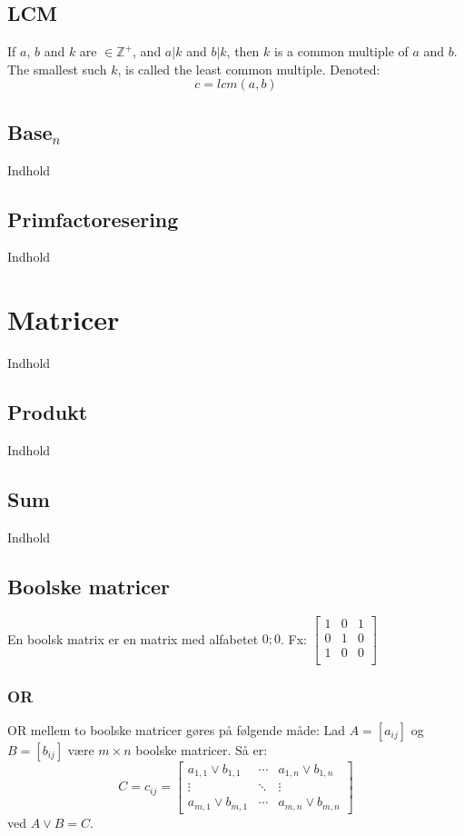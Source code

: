 \documentclass[a4paper]{article}
\newcommand{\Integers}{\mathbb{Z}}
\begin{document}
  \subsection{LCM}
   If $a$, $b$ and $k$ are $\in \Integers^+$, and $a | k$ and $b | k$, then $k$ is a common multiple of $a$ and $b$. The smallest such $k$, is called the least common multiple. Denoted:
    $$c = lcm(a, b)$$
  \subsection{Base$_n$}
    Indhold
  \subsection{Primfactoresering}
    Indhold
\section{Matricer}
  Indhold
  \subsection{Produkt}
    Indhold
  \subsection{Sum}
    Indhold
  \subsection{Boolske matricer}
    En boolsk matrix er en matrix med alfabetet ${0;0}$. Fx:
    $\left[\begin{smallmatrix}
      1 & 0 & 1 \\
      0 & 1 & 0 \\
      1 & 0 & 0  \\
    \end{smallmatrix}\right]$
    \subsubsection{OR}
      OR mellem to boolske matricer gøres på følgende måde:
      Lad $A = [a_{ij}]$ og $B= [b_{ij}]$ være $m \times n$ boolske matricer. Så er:
      $$
        C = c_{ij} = \begin{bmatrix}
                    a_{1,1} \vee b_{1,1} & \cdots & a_{1,n} \vee b_{1,n} \\
                    \vdots               & \ddots & \vdots \\
                    a_{m,1} \vee b_{m,1} & \cdots & a_{m,n} \vee b_{m,n}
                  \end{bmatrix}
      $$
      ved $A \vee B = C$.
\end{document}
